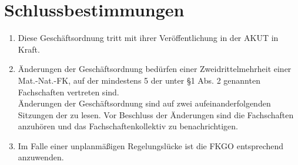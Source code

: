 \documentclass{article}
\begin{document}
	\section{Schlussbestimmungen}
	\begin{enumerate}[(1)]
		\setlength\itemsep{0pt}
		\item Diese Geschäftsordnung tritt mit ihrer Veröffentlichung in der AKUT in Kraft.
		\item Änderungen der Geschäftsordnung bedürfen einer Zweidrittelmehrheit einer Mat.-Nat.-FK, auf der mindestens 5 der unter §1 Abs. 2 genannten Fachschaften vertreten sind.\\
		Änderungen der Geschäftsordnung sind auf zwei aufeinanderfolgenden Sitzungen der \mnfk zu lesen.
		Vor Beschluss der Änderungen sind die Fachschaften anzuhören und das Fachschaftenkollektiv zu benachrichtigen.
		\item Im Falle einer unplanmäßigen Regelungslücke ist die FKGO entsprechend anzuwenden.
	\end{enumerate}
\end{document}
